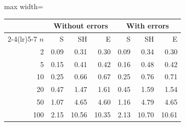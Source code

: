 \begin{adjustbox}{max width=\linewidth}\begin{tabular}{rrrrrrr}
\toprule
 & \multicolumn{3}{c}{Without errors} & \multicolumn{3}{c}{With errors} \\
\cmidrule(lr){2-4}\cmidrule(lr){5-7}
$n$ & S & SH & E & S & SH & E \\
\midrule
2 & 0.09 & 0.31 & 0.30 & 0.09 & 0.34 & 0.30 \\
5 & 0.15 & 0.41 & 0.42 & 0.16 & 0.48 & 0.42 \\
10 & 0.25 & 0.66 & 0.67 & 0.25 & 0.76 & 0.71 \\
20 & 0.47 & 1.47 & 1.61 & 0.45 & 1.59 & 1.54 \\
50 & 1.07 & 4.65 & 4.60 & 1.16 & 4.79 & 4.65 \\
100 & 2.15 & 10.56 & 10.35 & 2.13 & 10.70 & 10.61 \\
\bottomrule
\end{tabular}\end{adjustbox}
